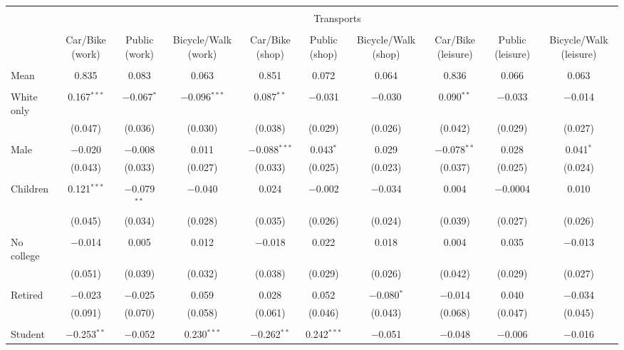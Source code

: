 
\begin{tabular}{@{\extracolsep{5pt}}lccccccccc} 
\\[-1.8ex]\hline 
\hline \\[-1.8ex] 
 & \multicolumn{9}{c}{Transports} \\ 
\cline{2-10} 
\\[-1.8ex] & Car/Bike (work) & Public (work) & Bicycle/Walk (work) & Car/Bike (shop) & Public (shop) & Bicycle/Walk (shop) & Car/Bike (leisure) & Public (leisure) & Bicycle/Walk (leisure) \\ 
\hline \\[-1.8ex] 
 Mean & 0.835 & 0.083 & 0.063 & 0.851 & 0.072 & 0.064 & 0.836 & 0.066 & 0.063  \\ \hline \\[-1.8ex] White only & 0.167$^{***}$ & $-$0.067$^{*}$ & $-$0.096$^{***}$ & 0.087$^{**}$ & $-$0.031 & $-$0.030 & 0.090$^{**}$ & $-$0.033 & $-$0.014 \\ 
  & (0.047) & (0.036) & (0.030) & (0.038) & (0.029) & (0.026) & (0.042) & (0.029) & (0.027) \\ 
  & & & & & & & & & \\ 
 Male & $-$0.020 & $-$0.008 & 0.011 & $-$0.088$^{***}$ & 0.043$^{*}$ & 0.029 & $-$0.078$^{**}$ & 0.028 & 0.041$^{*}$ \\ 
  & (0.043) & (0.033) & (0.027) & (0.033) & (0.025) & (0.023) & (0.037) & (0.025) & (0.024) \\ 
  & & & & & & & & & \\ 
 Children & 0.121$^{***}$ & $-$0.079$^{**}$ & $-$0.040 & 0.024 & $-$0.002 & $-$0.034 & 0.004 & $-$0.0004 & 0.010 \\ 
  & (0.045) & (0.034) & (0.028) & (0.035) & (0.026) & (0.024) & (0.039) & (0.027) & (0.026) \\ 
  & & & & & & & & & \\ 
 No college & $-$0.014 & 0.005 & 0.012 & $-$0.018 & 0.022 & 0.018 & 0.004 & 0.035 & $-$0.013 \\ 
  & (0.051) & (0.039) & (0.032) & (0.038) & (0.029) & (0.026) & (0.042) & (0.029) & (0.027) \\ 
  & & & & & & & & & \\ 
 Retired & $-$0.023 & $-$0.025 & 0.059 & 0.028 & 0.052 & $-$0.080$^{*}$ & $-$0.014 & 0.040 & $-$0.034 \\ 
  & (0.091) & (0.070) & (0.058) & (0.061) & (0.046) & (0.043) & (0.068) & (0.047) & (0.045) \\ 
  & & & & & & & & & \\ 
 Student & $-$0.253$^{**}$ & $-$0.052 & 0.230$^{***}$ & $-$0.262$^{**}$ & 0.242$^{***}$ & $-$0.051 & $-$0.048 & $-$0.006 & $-$0.016 \\ 

\end{tabular}
